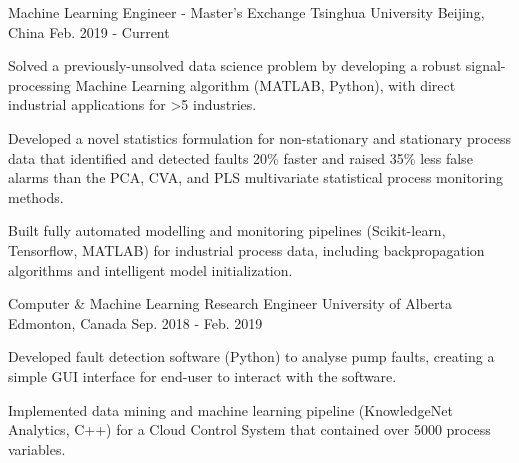 

\begin{cventries}

  \cventry
    {Machine Learning Engineer - Master's Exchange} %
    {Tsinghua University} %
    {Beijing, China} %
    {Feb. 2019 - Current} %
    {
      \begin{cvitems} %
        \item {Solved a previously-unsolved data science problem by developing a robust signal-processing Machine Learning algorithm (MATLAB, Python), with direct industrial applications for >5 industries.}
        \item {Developed a novel statistics formulation for non-stationary and stationary process data that identified and detected faults 20\% faster and raised 35\% less false alarms than the PCA, CVA, and PLS multivariate statistical process monitoring methods.}
        \item {Built fully automated modelling and monitoring pipelines (Scikit-learn, Tensorflow, MATLAB) for industrial process data, including backpropagation algorithms and intelligent model initialization.}
      \end{cvitems}
    }

  \cventry
    {Computer \& Machine Learning Research Engineer} %
    {University of Alberta} %
    {Edmonton, Canada} %
    {Sep. 2018 - Feb. 2019} %
    {
      \begin{cvitems} %
        \item {Developed fault detection software (Python) to analyse pump faults, creating a simple GUI interface for end-user to interact with the software.}
        \item {Implemented data mining and machine learning pipeline (KnowledgeNet Analytics, C++) for a Cloud Control System that contained over 5000 process variables.}
      \end{cvitems}
    }


\end{cventries}
